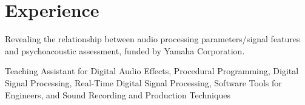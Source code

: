 \documentclass[letterpaper]{deedy-resume} %
\begin{document}
{\begin{minipage}[t]{0.66\textwidth}

\section{Experience}

\hspace{-0.1cm}
\vspace{\topsep} %

\hspace{-0.1cm}
\vspace{\topsep} %
\begin{tightitemize}
\item Revealing the relationship between audio processing parameters/signal features and psychoacoustic assessment, funded by Yamaha Corporation. 
\item Teaching Assistant for Digital Audio Effects, Procedural Programming, Digital Signal Processing, Real-Time Digital Signal Processing, Software Tools for Engineers, and Sound Recording and Production Techniques
\end{tightitemize}



\end{minipage}}
\end{document}
